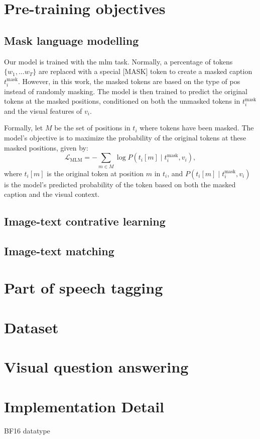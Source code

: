 \section{Pre-training objectives}

\subsection{Mask language modelling}
Our model is trained with the \acrshort{mlm} task.
Normally, a percentage of tokens \(\{w_1,...w_T\}\) are replaced with a special [MASK] token to create a masked caption \(t_i^{\text{mask}}\).
However, in this work, the masked tokens are based on the type of \acrshort{pos} instead of randomly masking.
The model is then trained to predict the original tokens at the masked positions, conditioned on both the unmasked tokens in \(t_i^{\text{mask}}\) and the visual features of \(v_i\). 

Formally, let \(M\) be the set of positions in \(t_i\) where tokens have been masked. 
The model’s objective is to maximize the probability of the original tokens at these masked positions, given by:
\[
\mathcal{L}_{\text{MLM}} = - \sum_{m \in M} \log P\left(t_i[m] \mid t_i^{\text{mask}}, v_i\right),
\]
where \(t_i[m]\) is the original token at position \(m\) in \(t_i\), and \(P(t_i[m] \mid t_i^{\text{mask}}, v_i)\) is the model's predicted probability of the token based on both the masked caption and the visual context. 

\subsection{Image-text contrative learning}

\subsection{Image-text matching}
\section{Part of speech tagging}


\section{Dataset}


\section{Visual question answering}


\section{Implementation Detail}
BF16 datatype